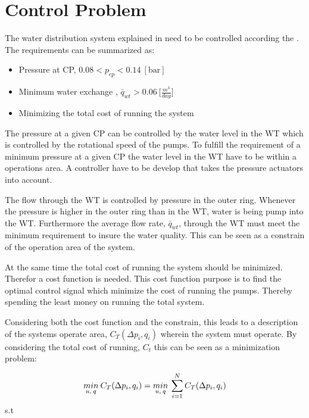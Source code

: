 \section{Control Problem}
\label{control_problem}

The water distribution system explained in  need to be controlled according the . The requirements can be summarized as: 

\begin{itemize}
	\item Pressure at CP, $0.08 < p_{cp} < 0.14 \:[\text{bar}]$
%
	\item Minimum water exchange , $\bar{q}_{wt} > 0.06 \: \big[\frac{m^3}{day}\big]$
%
	\item Minimizing the total cost of running the system
\end{itemize}


The pressure at a given CP can be controlled by the water level in the WT which is controlled by the rotational speed of the pumps. To fulfill the requirement of a minimum pressure at a given CP the water level in the WT have to be within a operations area. A controller have to be develop that takes the pressure actuators into account. 

The flow through the WT is controlled by pressure in the outer ring. Whenever the pressure is higher in the outer ring than in the WT, water is being pump into the WT. Furthermore the average flow rate, $\bar{q}_{wt}$, through the WT must meet the minimum requirement to insure the water quality. This can be seen as a constrain of the operation area of the system. 

At the same time the total cost of running the system should be minimized. Therefor a cost function is needed. This cost function purpose is to find the optimal control signal which minimize the cost of running the pumps. Thereby spending the least money on running the total system. 

Considering both the cost function and the constrain, this leads to a description of the systems operate area, $C_T(\Delta{p}_i,q_i)$ wherein the system must operate. By considering the total cost of running, $C_t$ this can be seen as a minimization problem:

\begin{equation}
\underset{u, \:q}{min} \: C_T(\Delta{p}_i,q_i) = \underset{u, \:q}{min} \: \sum_{i=1}^{N} C_T(\Delta{p}_i,q_i)  \\
\end{equation}
\vspace*{-0.5mm}
s.t 

